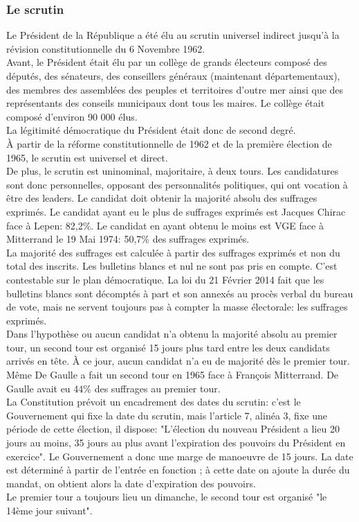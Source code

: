 \documentclass[12pt, a4paper, openany]{book}
\begin{document}
\subsubsection{Le scrutin}

Le Président de la République a été élu au scrutin universel indirect jusqu'à la révision constitutionnelle du 6 Novembre 1962. \\
Avant, le Président était élu par un collège de grands électeurs composé des députés, des sénateurs, des conseillers généraux (maintenant départementaux), des membres des assemblées des peuples et territoires d'outre mer ainsi que des représentants des conseils municipaux dont tous les maires. Le collège était composé d'environ 90 000 élus. \\
La légitimité démocratique du Président était donc de second degré. \\
À partir de la réforme constitutionnelle de 1962 et de la première élection de 1965, le scrutin est universel et direct. \\
De plus, le scrutin est uninominal, majoritaire, à deux tours. Les candidatures sont donc personnelles, opposant des personnalités politiques, qui ont vocation à être des leaders. Le candidat doit obtenir la majorité absolu des suffrages exprimés. Le candidat ayant eu le plus de suffrages exprimés est Jacques Chirac face à Lepen: 82,2\%. Le candidat en ayant obtenu le moins est VGE face à Mitterrand le 19 Mai 1974: 50,7\% des suffrages exprimés. \\
La majorité des suffrages est calculée à partir des suffrages exprimés et non du total des inscrits. Les bulletins blancs et nul ne sont pas pris en compte. C'est contestable sur le plan démocratique. La loi du 21 Février 2014 fait que les bulletins blancs sont décomptés à part et son annexés au procès verbal du bureau de vote, mais ne servent toujours pas à compter la masse électorale: les suffrages exprimés. \\
Dans l'hypothèse ou aucun candidat n'a obtenu la majorité absolu au premier tour, un second tour est organisé 15 jours plus tard entre les deux candidats arrivés en tête. À ce jour, aucun candidat n'a eu de majorité dès le premier tour. Même De Gaulle a fait un second tour en 1965 face à François Mitterrand. De Gaulle avait eu 44\% des suffrages au premier tour. \\
La Constitution prévoit un encadrement des dates du scrutin: c'est le Gouvernement qui fixe la date du scrutin, mais l'article 7, alinéa 3, fixe une période de cette élection, il dispose: "L'élection du nouveau Président a lieu 20 jours au moins, 35 jours au plus avant l'expiration des pouvoirs du Président en exercice". Le Gouvernement a donc une marge de manoeuvre de 15 jours. La date est déterminé à partir de l'entrée en fonction ; à cette date on ajoute la durée du mandat, on obtient alors la date d'expiration des pouvoirs. \\ 
Le premier tour a toujours lieu un dimanche, le second tour est organisé "le 14ème jour suivant". 
\end{document}
